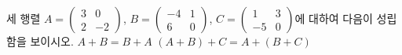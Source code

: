\hspace*{2mm}\begin{minipage}[t]{\dimexpr\linewidth-2mm\relax}\vspace{0pt}
세 행렬 $A=\begin{pmatrix} 3 & 0 \\ 2 & -2 \end{pmatrix}$, $B=\begin{pmatrix} -4 & 1 \\ 6 & 0 \end{pmatrix}$, $C=\begin{pmatrix} 1 & 3 \\ -5 & 0 \end{pmatrix}$에 대하여 다음이 성립함을 보이시오.
 $A+B=B+A$
 $(A+B)+C=A+(B+C)$\end{minipage}
